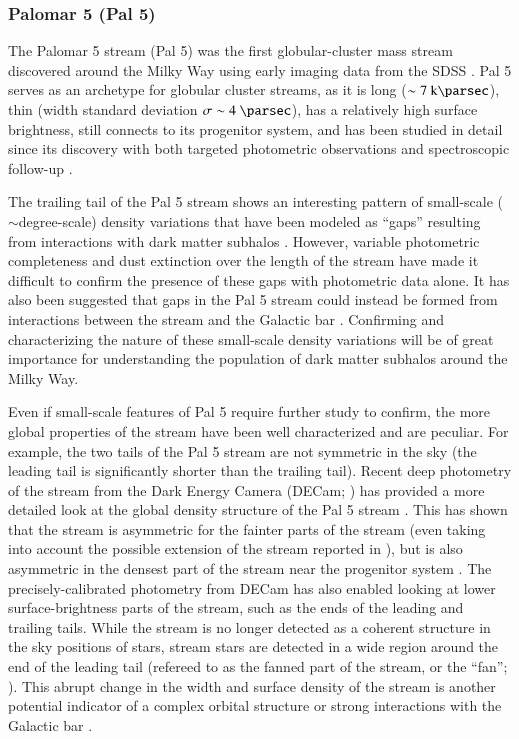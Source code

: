 \documentclass[final,5p,times,twocolumn,authoryear]{elsarticle}
\begin{document}
\subsubsection{Palomar 5 (Pal 5)}
\label{sec:pal5}

The Palomar 5 stream (Pal 5) was the first globular-cluster mass stream discovered
around the Milky Way using early imaging data from the SDSS \citep{odenkirchen:2001,
rockosi:2002, grillmair:2006-pal5}.
Pal 5 serves as an archetype for globular cluster streams, as it is long ($\sim
7~\kpc$), thin (width standard deviation $\sigma \sim 4~\unit{\parsec}$), has a
relatively high surface brightness, still connects to its progenitor system, and has
been studied in detail since its discovery with both targeted photometric observations
\citep{ibata:2016, bonaca:2020} and spectroscopic follow-up \citep{kuzma:2015,
ishigaki:2016, ibata:2017, kuzma:2022}.

The trailing tail of the Pal 5 stream shows an interesting pattern of small-scale
($\sim$degree-scale) density variations that have been modeled as ``gaps'' resulting
from interactions with dark matter subhalos \citep{carlberg:2012, erkal:2017}.
However, variable photometric completeness and dust extinction over the length of the
stream have made it difficult to confirm the presence of these gaps with photometric
data alone.
It has also been suggested that gaps in the Pal 5 stream could instead be formed from
interactions between the stream and the Galactic bar \citep{pearson:2017}.
Confirming and characterizing the nature of these small-scale density variations will be
of great importance for understanding the population of dark matter subhalos around the
Milky Way.

Even if small-scale features of Pal 5 require further study to confirm, the more global
properties of the stream have been well characterized and are peculiar.
For example, the two tails of the Pal 5 stream are not symmetric in the sky (the leading
tail is significantly shorter than the trailing tail).
Recent deep photometry of the stream from the Dark Energy Camera (DECam; \citealt{todo})
has provided a more detailed look at the global density structure of the Pal 5 stream
\citep{bonaca:2020}.
This has shown that the stream is asymmetric for the fainter parts of the stream (even
taking into account the possible extension of the stream reported in
\citealt{starkman:2020}), but is also asymmetric in the densest part of the stream near
the progenitor system \citep[see Figure 2 of][]{bonaca:2020}.
The precisely-calibrated photometry from DECam has also enabled looking at lower
surface-brightness parts of the stream, such as the ends of the leading and trailing
tails.
While the stream is no longer detected as a coherent structure in the sky positions of
stars, stream stars are detected in a wide region around the end of the leading tail
(refereed to as the fanned part of the stream, or the ``fan''; \citealt{bonaca:2020}).
This abrupt change in the width and surface density of the stream is another potential
indicator of a complex orbital structure \citep{pearson:2015, price-whelan:2016a} or
strong interactions with the Galactic bar \citep{pearson:2017, bonaca:2020}.
\end{document}
